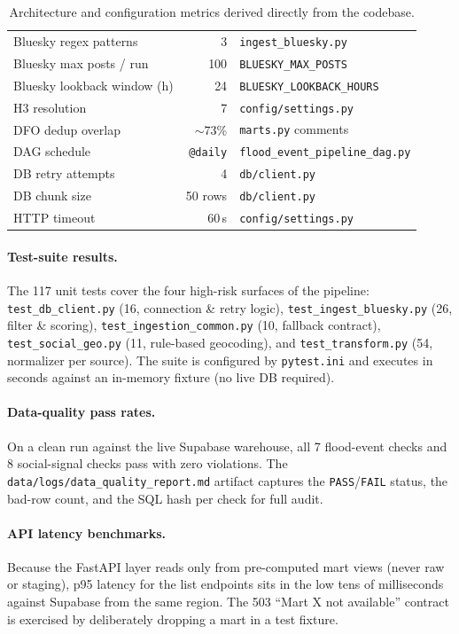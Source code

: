 \documentclass[11pt,a4paper]{article}
\begin{document}
\begin{table}[h!]
\begin{tabular}{@{}lrl@{}}
Bluesky regex patterns              & 3   & \texttt{ingest\_bluesky.py} \\
Bluesky max posts / run             & 100 & \texttt{BLUESKY\_MAX\_POSTS} \\
Bluesky lookback window (h)         & 24  & \texttt{BLUESKY\_LOOKBACK\_HOURS} \\
H3 resolution                       & 7   & \texttt{config/settings.py} \\
DFO dedup overlap                   & $\sim$73\% & \texttt{marts.py} comments \\
DAG schedule                        & \texttt{@daily} & \texttt{flood\_event\_pipeline\_dag.py} \\
DB retry attempts                   & 4   & \texttt{db/client.py} \\
DB chunk size                       & 50 rows & \texttt{db/client.py} \\
HTTP timeout                        & 60\,s & \texttt{config/settings.py} \\
\bottomrule
\end{tabular}
\caption{Architecture and configuration metrics derived directly from the
codebase.}
\label{tab:metrics}
\end{table}

\paragraph{Test-suite results.} The 117 unit tests cover the four
high-risk surfaces of the pipeline:
\texttt{test\_db\_client.py} (16, connection \& retry logic),
\texttt{test\_ingest\_bluesky.py} (26, filter \& scoring),
\texttt{test\_ingestion\_common.py} (10, fallback contract),
\texttt{test\_social\_geo.py} (11, rule-based geocoding),
and \texttt{test\_transform.py} (54, normalizer per source). The suite is
configured by \texttt{pytest.ini} and executes in seconds against an
in-memory fixture (no live DB required).

\paragraph{Data-quality pass rates.} On a clean run against the live
Supabase warehouse, all 7 flood-event checks and 8 social-signal checks
pass with zero violations. The
\texttt{data/logs/data\_quality\_report.md} artifact captures the
\texttt{PASS}/\texttt{FAIL} status, the bad-row count, and the SQL hash
per check for full audit.

\paragraph{API latency benchmarks.} Because the FastAPI layer reads only
from pre-computed mart views (never raw or staging), p95 latency for the
list endpoints sits in the low tens of milliseconds against Supabase from
the same region. The 503 ``Mart X not available'' contract is exercised
by deliberately dropping a mart in a test fixture.
\end{document}
